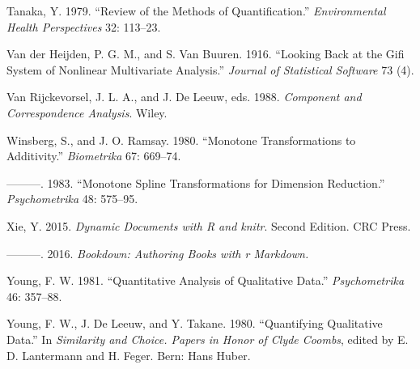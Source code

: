 \documentclass[
  12pt,
  letterpaper,
]{scrbook}
\newlength{\cslhangindent}
\newenvironment{CSLReferences}[2] %
 {\begin{list}{}{%
  \setlength{\itemindent}{0pt}
  \setlength{\leftmargin}{0pt}
  \setlength{\parsep}{0pt}
  \ifodd #1
   \setlength{\leftmargin}{\cslhangindent}
   \setlength{\itemindent}{-1\cslhangindent}
  \fi
  \setlength{\itemsep}{#2\baselineskip}}}
 {\end{list}}
\begin{document}
\begin{CSLReferences}{1}{0}
Tanaka, Y. 1979. {``{Review of the Methods of Quantification}.''}
\emph{Environmental Health Perspectives} 32: 113--23.

Van der Heijden, P. G. M., and S. Van Buuren. 1916. {``Looking Back at
the Gifi System of Nonlinear Multivariate Analysis.''} \emph{Journal of
Statistical Software} 73 (4).

Van Rijckevorsel, J. L. A., and J. De Leeuw, eds. 1988. \emph{Component
and Correspondence Analysis}. Wiley.

Winsberg, S., and J. O. Ramsay. 1980. {``{Monotone Transformations to
Additivity}.''} \emph{Biometrika} 67: 669--74.

---------. 1983. {``{Monotone Spline Transformations for Dimension
Reduction}.''} \emph{Psychometrika} 48: 575--95.

Xie, Y. 2015. \emph{{Dynamic Documents with R and knitr}}. Second
Edition. CRC Press.

---------. 2016. \emph{Bookdown: Authoring Books with r Markdown.}

Young, F. W. 1981. {``{Quantitative Analysis of Qualitative Data}.''}
\emph{Psychometrika} 46: 357--88.

Young, F. W., J. De Leeuw, and Y. Takane. 1980. {``Quantifying
Qualitative Data.''} In \emph{Similarity and Choice. Papers in Honor of
Clyde Coombs}, edited by E. D. Lantermann and H. Feger. Bern: Hans
Huber.

\end{CSLReferences}


\backmatter
\end{document}
